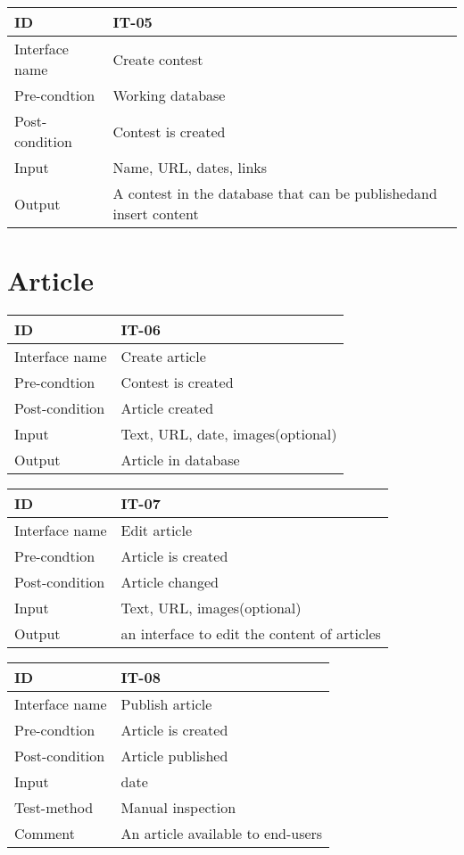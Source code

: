 \begin{longtable}{|l|p{}|}
\hline
ID & IT-05\\\hline
Interface name & Create contest\\\hline
Pre-condtion & Working database\\\hline
Post-condition & Contest is created\\\hline
Input & Name, URL, dates, links\\\hline
Output & A contest in the database that can be publishedand insert
content\\\hline
\end{longtable}


\section{Article}


\begin{longtable}{|l|p{}|}
\hline
ID & IT-06\\\hline
Interface name & Create article\\\hline
Pre-condtion & Contest is created\\\hline
Post-condition & Article created\\\hline
Input & Text, URL, date, images(optional)\\\hline
Output & Article in database\\\hline
\end{longtable}


\begin{longtable}{|l|p{}|}
\hline
ID & IT-07\\\hline
Interface name & Edit article\\\hline
Pre-condtion & Article is created\\\hline
Post-condition & Article changed\\\hline
Input & Text, URL, images(optional)\\\hline
Output & an interface to edit the content of
articles\\\hline
\end{longtable}


\begin{longtable}{|l|p{}|}
\hline
ID & IT-08\\\hline
Interface name & Publish article\\\hline
Pre-condtion & Article is created\\\hline
Post-condition & Article published\\\hline
Input & date\\\hline
Test-method & Manual inspection\\\hline
Comment & An article available to end-users\\\hline
\end{longtable}

